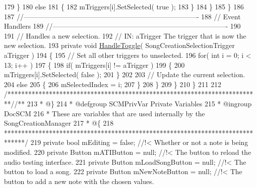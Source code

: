 \begin{DoxyCodeInclude}
179                 \}
180                 \textcolor{keywordflow}{else}
181                 \{
182                     mTriggers[i].SetSelected( \textcolor{keyword}{true} );
183                 \}
184             \}
185         \}
186 
187         \textcolor{comment}{//---------------------------------------------------------------------------- }
188         \textcolor{comment}{// Event Handlers}
189         \textcolor{comment}{//----------------------------------------------------------------------------}
190 
191         \textcolor{comment}{// Handles a new selection.}
192         \textcolor{comment}{// IN: aTrigger The trigger that is now the new selection.}
193         \textcolor{keyword}{private} \textcolor{keywordtype}{void} \hyperlink{group___s_c_m_nest_class_a534fec983fb7e5a7f948513672aa64b4}{HandleToggle}( SongCreationSelectionTrigger aTrigger )
194         \{
195             \textcolor{comment}{// Set all other triggers to unselected.}
196             \textcolor{keywordflow}{for}( \textcolor{keywordtype}{int} i = 0; i < 13; i++ )
197             \{
198                 \textcolor{keywordflow}{if}( mTriggers[i] != aTrigger )
199                 \{
200                     mTriggers[i].SetSelected( \textcolor{keyword}{false} );
201                 \}
202 
203                 \textcolor{comment}{// Update the current selection.}
204                 \textcolor{keywordflow}{else}
205                 \{
206                     mSelectedIndex = i;
207                 \}
208             \}
209         \}
210     \}
211 
212     \textcolor{comment}{/*************************************************************************/}\textcolor{comment}{/** }
213 \textcolor{comment}{    * @\}}
214 \textcolor{comment}{    * @defgroup SCMPrivVar Private Variables}
215 \textcolor{comment}{    * @ingroup DocSCM}
216 \textcolor{comment}{    * These are variables that are used internally by the SongCreationManager}
217 \textcolor{comment}{    * @\{}
218 \textcolor{comment}{    ******************************************************************************/}
219     \textcolor{keyword}{private} \textcolor{keywordtype}{bool} mEditing = \textcolor{keyword}{false}; \textcolor{comment}{//!< Whether or not a note is being modified.}
220 \textcolor{comment}{}    \textcolor{keyword}{private} Button mATIButton = null; \textcolor{comment}{//!< The button to reload the audio testing interface.}
221 \textcolor{comment}{}    \textcolor{keyword}{private} Button mLoadSongButton = null; \textcolor{comment}{//!< The button to load a song.}
222 \textcolor{comment}{}    \textcolor{keyword}{private} Button mNewNoteButton = null; \textcolor{comment}{//!< The button to add a new note with the chosen values.}

\end{DoxyCodeInclude}
